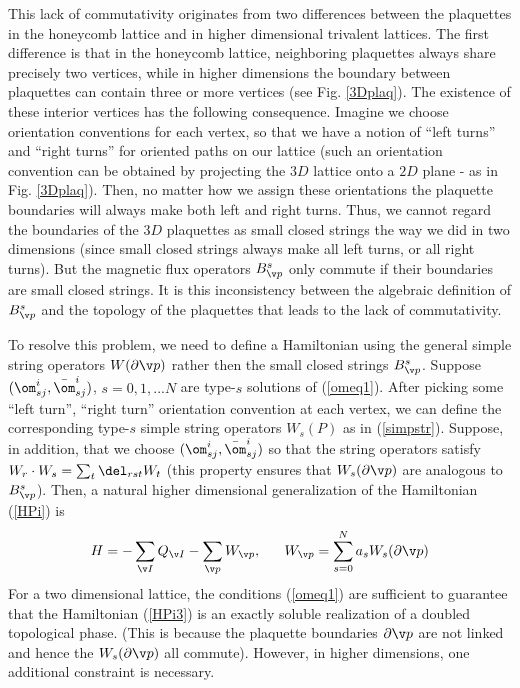 \documentclass[aps,twocolumn,groupedaddress,showpacs,floatfix]{revtex4}
\begin{document}
This lack of commutativity originates from two differences between the 
plaquettes in the honeycomb lattice and in higher dimensional trivalent 
lattices. The first difference is that in the honeycomb lattice, neighboring 
plaquettes always share precisely two vertices, while in higher dimensions the 
boundary between plaquettes can contain three or more vertices 
(see Fig. \ref{3Dplaq}). The existence of these interior vertices has the 
following consequence. Imagine we choose orientation conventions for each 
vertex, so that we have a notion of ``left turns'' and ``right turns'' for 
oriented paths on our lattice (such an orientation convention can be obtained
by projecting the $3D$ lattice onto a $2D$ plane - as in Fig. 
\ref{3Dplaq}). Then, no matter how we assign these orientations the plaquette 
boundaries will always make both left and right turns. Thus, we cannot regard 
the boundaries of the $3D$ plaquettes as small closed strings the
way we did in two dimensions (since small closed strings always make all left 
turns, or all right turns). But the magnetic flux operators $B^{s}_{\v p}$ only
commute if their boundaries are small closed strings. It is this inconsistency 
between the algebraic definition of $B^{s}_{\v p}$ and the topology of the 
plaquettes that leads to the lack of commutativity.

To resolve this problem, we need to define a Hamiltonian using the general 
simple string operators $W(\partial \v p)$ rather then the small closed 
strings $B^{s}_{\v p}$. Suppose $(\om^{i}_{sj}, \bar \om^{i}_{sj})$,
$s = 0,1,...N$ are type-$s$ solutions of (\ref{omeq1}). After picking 
some ``left turn'', ``right turn'' orientation convention at each vertex, we 
can define the corresponding type-$s$ simple string operators $W_s(P)$ as in 
(\ref{simpstr}). Suppose, in addition, that we choose $(\om^{i}_{sj}, \bar 
\om^{i}_{sj})$ so that the string operators satisfy 
$W_{r} \cdot W_{s} = \sum_{t} \del_{rst} W_{t}$ (this property ensures that 
$W_{s}(\partial \v p)$ are analogous to $B^{s}_{\v p}$). Then, a natural higher
dimensional generalization of the Hamiltonian (\ref{HPi}) is 
\begin{equation} 
 H= - \sum_{\v I} Q_{\v I}-\sum_{\v p} W_{\v p}, \ \ \ \ \  W_{\v p}= 
\sum_{s=0}^N a_s W_s(\partial \v p)
\label{HPi3}
\end{equation}
For a two dimensional
lattice, the conditions (\ref{omeq1}) are sufficient to guarantee that the
Hamiltonian (\ref{HPi3}) is an exactly soluble realization of a doubled
topological phase. (This is because the plaquette boundaries $\partial \v 
p$ are not linked and hence the $W_s(\partial \v p)$ all commute). However, in 
higher dimensions, one additional constraint is necessary. 
\end{document}
